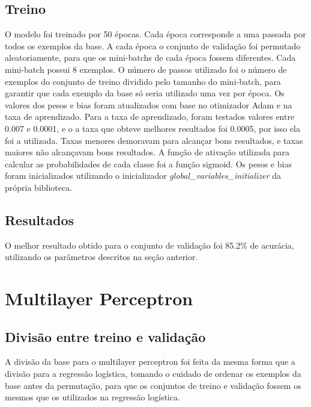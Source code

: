 \documentclass[conference]{IEEEtran}
\begin{document}
\subsection{Treino}
O modelo foi treinado por 50 épocas. Cada época corresponde a uma passada por todos os exemplos da base. A cada época o conjunto de validação foi permutado aleatoriamente, para que os mini-batchs de cada época fossem diferentes. Cada mini-batch possui 8 exemplos. O número de passos utilizado foi o número de exemplos do conjunto de treino dividido pelo tamanho do mini-batch, para garantir que cada exemplo da base só seria utilizado uma vez por época. Os valores dos pesos e bias foram atualizados com base no otimizador Adam e na taxa de aprendizado. Para a taxa de aprendizado, foram testados valores entre 0.007 e 0.0001, e o a taxa que obteve melhores resultados foi 0.0005, por isso ela foi a utilizada. Taxas menores demoravam para alcançar bons resultados, e taxas maiores não alcançavam bons resultados. A função de ativação utilizada para calcular as probabilidades de cada classe foi a função sigmoid. Os pesos e bias foram inicializados utilizando o inicializador \textit{global\_variables\_initializer} da própria biblioteca.

\subsection{Resultados}
O melhor resultado obtido para o conjunto de validação foi 85.2\% de acurácia, utilizando os parâmetros descritos na seção anterior.

\section{Multilayer Perceptron}

\subsection{Divisão entre treino e validação}
A divisão da base para o multilayer perceptron foi feita da mesma forma que a divisão para a regressão logística, tomando o cuidado de ordenar os exemplos da base antes da permutação, para que os conjuntos de treino e validação fossem os mesmos que os utilizados na regressão logística.
\end{document}
